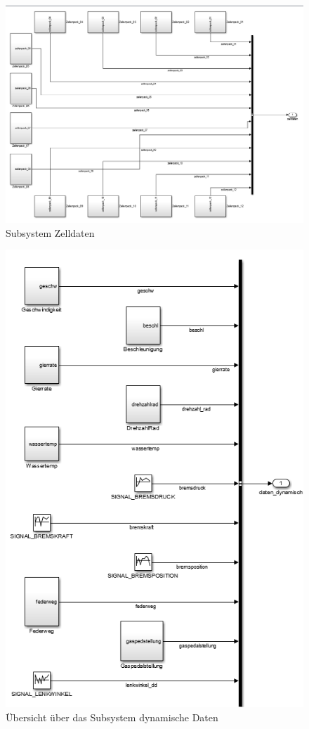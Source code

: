 \documentclass[fontsize = 12pt, paper = a4]{scrreprt}
\begin{document}
\begin{figure}
\centering
\includegraphics[scale = 0.65]{zelldaten}
\caption[Subsystem Zelldaten]{Subsystem Zelldaten}
\end{figure} 

\newpage

\begin{figure}[h]
\centering
\includegraphics[scale = 0.85]{dyndaten}
\caption[Subsystem Dynamische Daten]{Übersicht über das Subsystem dynamische Daten}
\label{dyndaten}
\end{figure} 
\end{document}

